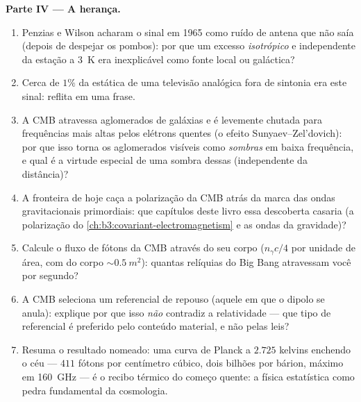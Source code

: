\begin{problem}
\medskip\noindent\textbf{Parte IV --- A herança.}
\begin{enumerate}[resume]
  \item Penzias e Wilson acharam o sinal em 1965 como
        ruído de antena que não saía (depois de despejar os pombos):
        por que um excesso \emph{isotrópico} e independente da estação a
        \qty{3}{K} era inexplicável como fonte local ou galáctica?
  \item Cerca de $1\%$ da estática de uma televisão analógica fora de
        sintonia era este sinal: reflita em uma frase.
  \item A CMB atravessa aglomerados de galáxias e é levemente
        chutada para frequências mais altas pelos elétrons quentes (o
        efeito Sunyaev--Zel'dovich): por que isso torna os aglomerados
        visíveis como \emph{sombras} em baixa frequência, e qual é a
        virtude especial de uma sombra dessas (independente da
        distância)?
  \item A fronteira de hoje caça a polarização da CMB atrás da
        marca das ondas gravitacionais primordiais: que capítulos
        deste livro essa descoberta casaria
        (a polarização do \cref{ch:b3:covariant-electromagnetism} e
        as ondas da gravidade)?
  \item Calcule o fluxo de fótons da CMB através do seu corpo
        ($n_\gamma c/4$ por unidade de área, com  do corpo
        $\sim\qty{0.5}{m^2}$): quantas relíquias do Big Bang
        atravessam você por segundo?
  \item A CMB seleciona um referencial de repouso (aquele em que o
        dipolo se anula): explique por que isso \emph{não}
        contradiz a relatividade --- que tipo de referencial é
        preferido pelo conteúdo material, e não pelas leis?
  \item Resuma o resultado nomeado: uma curva de Planck a $2.725$
        kelvins enchendo o céu --- $411$ fótons por centímetro
        cúbico, dois bilhões por bárion, máximo em
        \qty{160}{GHz} --- é o recibo térmico do começo
        quente: a física estatística como pedra fundamental da
        cosmologia.
\end{enumerate}
\end{problem}
